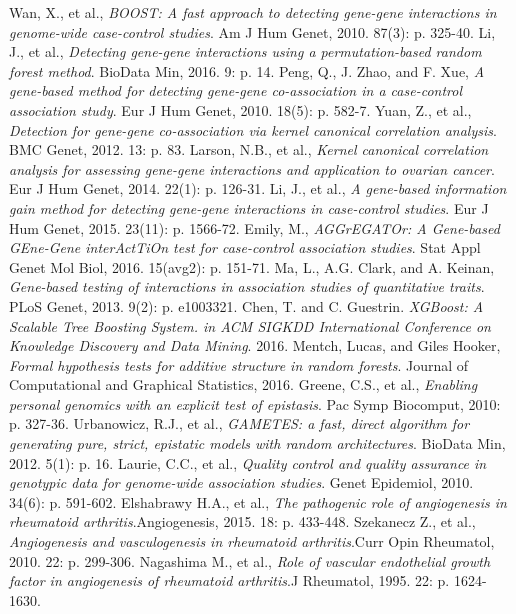\documentclass[11pt]{article}
\theoremstyle{plain}
\theoremstyle{definition}
\theoremstyle{remark}
\begin{document}
\begin{thebibliography}{20}
Wan, X., et al., {\em BOOST: A fast approach to detecting gene-gene interactions in genome-wide case-control studies}. Am J Hum Genet, 2010. 87(3): p. 325-40.
Li, J., et al., {\em Detecting gene-gene interactions using a permutation-based random forest method}. BioData Min, 2016. 9: p. 14.
Peng, Q., J. Zhao, and F. Xue, {\em A gene-based method for detecting gene-gene co-association in a case-control association study}. Eur J Hum Genet, 2010. 18(5): p. 582-7.
Yuan, Z., et al., {\em Detection for gene-gene co-association via kernel canonical correlation analysis}. BMC Genet, 2012. 13: p. 83.
Larson, N.B., et al., {\em Kernel canonical correlation analysis for assessing gene-gene interactions and application to ovarian cancer}. Eur J Hum Genet, 2014. 22(1): p. 126-31.
Li, J., et al., {\em A gene-based information gain method for detecting gene-gene interactions in case-control studies}. Eur J Hum Genet, 2015. 23(11): p. 1566-72.
Emily, M., {\em AGGrEGATOr: A Gene-based GEne-Gene interActTiOn test for case-control association studies}. Stat Appl Genet Mol Biol, 2016. 15(avg2): p. 151-71.
Ma, L., A.G. Clark, and A. Keinan, {\em Gene-based testing of interactions in association studies of quantitative traits}. PLoS Genet, 2013. 9(2): p. e1003321.
Chen, T. and C. Guestrin. {\em XGBoost: A Scalable Tree Boosting System. in ACM SIGKDD International Conference on Knowledge Discovery and Data Mining}. 2016.
Mentch, Lucas, and Giles Hooker, {\em Formal hypothesis tests for additive structure in random forests}. Journal of Computational and Graphical Statistics, 2016.
Greene, C.S., et al., {\em Enabling personal genomics with an explicit test of epistasis}. Pac Symp Biocomput, 2010: p. 327-36.
Urbanowicz, R.J., et al., {\em GAMETES: a fast, direct algorithm for generating pure, strict, epistatic models with random architectures}. BioData Min, 2012. 5(1): p. 16.
Laurie, C.C., et al., {\em Quality control and quality assurance in genotypic data for genome-wide association studies}. Genet Epidemiol, 2010. 34(6): p. 591-602.
Elshabrawy H.A., et al., {\em The pathogenic role of angiogenesis in rheumatoid arthritis}.Angiogenesis, 2015. 18: p. 433-448.
Szekanecz Z., et al., {\em Angiogenesis and vasculogenesis in rheumatoid arthritis}.Curr Opin Rheumatol, 2010. 22: p. 299-306.
Nagashima M., et al., {\em Role of vascular endothelial growth factor in angiogenesis of rheumatoid arthritis}.J Rheumatol, 1995. 22: p. 1624-1630.

\end{thebibliography}
\end{document}
